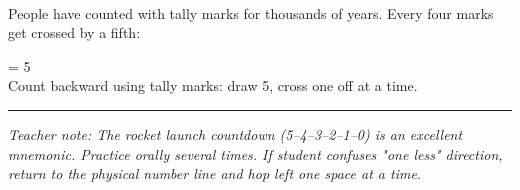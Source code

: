 \documentclass[12pt,letterpaper]{article}
\begin{document}
\vfill
{}\\
People have counted with tally marks for thousands of years.
Every four marks get crossed by a fifth: \quad
{}
\quad = 5\\[4pt]
Count backward using tally marks: draw 5, cross one off at a time.

\vspace{4pt}\hrule\vspace{3pt}
{\footnotesize\color{gray}\textit{Teacher note: The rocket launch countdown (5–4–3–2–1–0) is an excellent mnemonic.
  Practice orally several times. If student confuses "one less" direction,
  return to the physical number line and hop left one space at a time.}}
\end{document}
